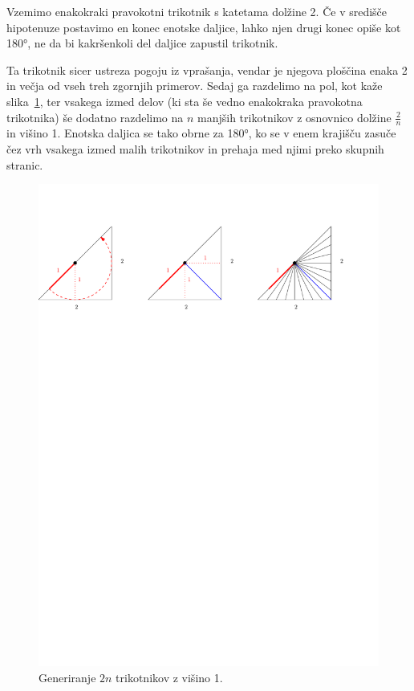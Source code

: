 \documentclass[a4paper, 12pt]{article}
\begin{document}
Vzemimo enakokraki pravokotni trikotnik s katetama dolžine 2. Če v središče hipotenuze postavimo en konec enotske daljice, lahko njen drugi konec opiše kot 180°, ne da bi kakršenkoli del daljice zapustil trikotnik.

Ta trikotnik sicer ustreza pogoju iz vprašanja, vendar je njegova ploščina enaka 2 in večja od vseh treh zgornjih primerov.
Sedaj ga razdelimo na pol, kot kaže slika~\ref{trikotnik_razdelitev}, ter vsakega izmed delov (ki sta še vedno enakokraka pravokotna trikotnika) še dodatno razdelimo na $ n $ manjših trikotnikov z osnovnico dolžine $ \frac{2}{n} $ in višino 1. Enotska daljica se tako obrne za 180°, ko se v enem krajišču zasuče čez vrh vsakega izmed malih trikotnikov in prehaja med njimi preko skupnih stranic.

\begin{figure}[h!]
    \centering
    \includegraphics[width=\textwidth]{ipe_slike/trikotnik_razdelitev.pdf}
    \caption{Generiranje $ 2n $ trikotnikov z višino 1.}
    \label{trikotnik_razdelitev}
\end{figure}
\end{document}
